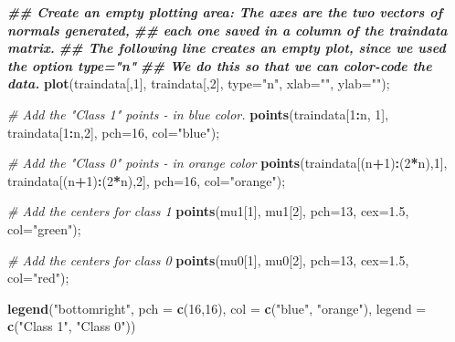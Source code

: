 \documentclass[
]{book}
\newenvironment{Shaded}{\begin{snugshade}}{\end{snugshade}}
\newcommand{\AttributeTok}[1]{\textcolor[rgb]{0.13,0.29,0.53}{#1}}
\newcommand{\CommentTok}[1]{\textcolor[rgb]{0.56,0.35,0.01}{\textit{#1}}}
\newcommand{\DecValTok}[1]{\textcolor[rgb]{0.00,0.00,0.81}{#1}}
\newcommand{\DocumentationTok}[1]{\textcolor[rgb]{0.56,0.35,0.01}{\textbf{\textit{#1}}}}
\newcommand{\FloatTok}[1]{\textcolor[rgb]{0.00,0.00,0.81}{#1}}
\newcommand{\FunctionTok}[1]{\textcolor[rgb]{0.13,0.29,0.53}{\textbf{#1}}}
\newcommand{\NormalTok}[1]{#1}
\newcommand{\SpecialCharTok}[1]{\textcolor[rgb]{0.81,0.36,0.00}{\textbf{#1}}}
\newcommand{\StringTok}[1]{\textcolor[rgb]{0.31,0.60,0.02}{#1}}
\begin{document}
\begin{Shaded}
\begin{Highlighting}[]
\DocumentationTok{\#\# Create an empty plotting area: The axes are the two vectors of normals generated, }
\DocumentationTok{\#\# each one saved in a column of the \textasciigrave{}traindata\textasciigrave{} matrix.}
\DocumentationTok{\#\# The following line creates an empty plot, since we used the option type="n"}
\DocumentationTok{\#\# We do this so that we can color{-}code the data.}
\FunctionTok{plot}\NormalTok{(traindata[,}\DecValTok{1}\NormalTok{], traindata[,}\DecValTok{2}\NormalTok{], }\AttributeTok{type=}\StringTok{"n"}\NormalTok{, }\AttributeTok{xlab=}\StringTok{""}\NormalTok{, }\AttributeTok{ylab=}\StringTok{""}\NormalTok{);}

\CommentTok{\# Add the "Class 1" points {-} in blue color.}
\FunctionTok{points}\NormalTok{(traindata[}\DecValTok{1}\SpecialCharTok{:}\NormalTok{n, }\DecValTok{1}\NormalTok{], traindata[}\DecValTok{1}\SpecialCharTok{:}\NormalTok{n,}\DecValTok{2}\NormalTok{], }\AttributeTok{pch=}\DecValTok{16}\NormalTok{, }\AttributeTok{col=}\StringTok{"blue"}\NormalTok{);}

\CommentTok{\# Add the "Class 0" points {-} in orange color}
\FunctionTok{points}\NormalTok{(traindata[(n}\SpecialCharTok{+}\DecValTok{1}\NormalTok{)}\SpecialCharTok{:}\NormalTok{(}\DecValTok{2}\SpecialCharTok{*}\NormalTok{n),}\DecValTok{1}\NormalTok{], traindata[(n}\SpecialCharTok{+}\DecValTok{1}\NormalTok{)}\SpecialCharTok{:}\NormalTok{(}\DecValTok{2}\SpecialCharTok{*}\NormalTok{n),}\DecValTok{2}\NormalTok{], }\AttributeTok{pch=}\DecValTok{16}\NormalTok{, }\AttributeTok{col=}\StringTok{"orange"}\NormalTok{); }

\CommentTok{\# Add the  centers for class 1}
\FunctionTok{points}\NormalTok{(mu1[}\DecValTok{1}\NormalTok{], mu1[}\DecValTok{2}\NormalTok{], }\AttributeTok{pch=}\DecValTok{13}\NormalTok{, }\AttributeTok{cex=}\FloatTok{1.5}\NormalTok{, }\AttributeTok{col=}\StringTok{"green"}\NormalTok{);    }

\CommentTok{\# Add the  centers for class 0}
\FunctionTok{points}\NormalTok{(mu0[}\DecValTok{1}\NormalTok{], mu0[}\DecValTok{2}\NormalTok{], }\AttributeTok{pch=}\DecValTok{13}\NormalTok{, }\AttributeTok{cex=}\FloatTok{1.5}\NormalTok{, }\AttributeTok{col=}\StringTok{"red"}\NormalTok{);   }

\FunctionTok{legend}\NormalTok{(}\StringTok{"bottomright"}\NormalTok{, }\AttributeTok{pch =} \FunctionTok{c}\NormalTok{(}\DecValTok{16}\NormalTok{,}\DecValTok{16}\NormalTok{), }\AttributeTok{col =} \FunctionTok{c}\NormalTok{(}\StringTok{"blue"}\NormalTok{, }\StringTok{"orange"}\NormalTok{), }
       \AttributeTok{legend =} \FunctionTok{c}\NormalTok{(}\StringTok{"Class 1"}\NormalTok{, }\StringTok{"Class 0"}\NormalTok{))}
\end{Highlighting}
\end{Shaded}
\end{document}
